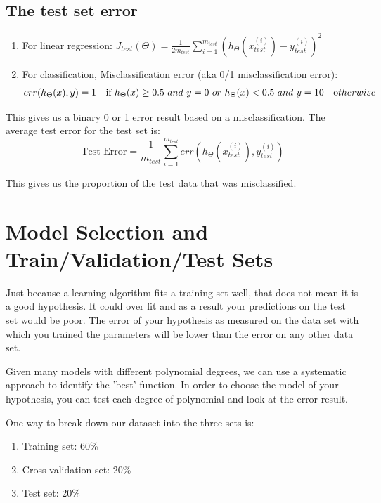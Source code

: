 \documentclass[10pt,a4paper,UTF8]{article}
\begin{document}
\subsection{The test set error}
\label{sec:orgfa849e7}

\begin{enumerate}
\item For linear regression: \(J_{test}(\Theta) = \frac{1}{2m_{test}}\sum_{i=1}^{m_{test}} (h_{\Theta}(x_{test}^{(i)}) - y_{test}^{(i)})^{2}\)
\item For classification, Misclassification error (aka 0/1 misclassification error):\[err(h_\Theta(x),y) = \begin{matrix} 1 & \mbox{if } h_\Theta(x) \geq 0.5\ and\ y = 0\ or\ h_\Theta(x) < 0.5\ and\ y = 1\newline 0 & \mbox otherwise \end{matrix}\]
\end{enumerate}

This gives us a binary 0 or 1 error result based on a misclassification. The average test error for the test set is:
\begin{equation}
\label{eq:1}
\text{Test Error} = \dfrac{1}{m_{test}} \sum^{m_{test}}_{i=1} err(h_\Theta(x^{(i)}_{test}), y^{(i)}_{test})
\end{equation}

This gives us the proportion of the test data that was misclassified.
\section{Model Selection and Train/Validation/Test Sets}
\label{sec:org9789aa7}


Just because a learning algorithm fits a training set well, that does not mean it is a good hypothesis. It could over fit and as a result your predictions on the test set would be poor. The error of your hypothesis as measured on the data set with which you trained the parameters will be lower than the error on any other data set.

Given many models with different polynomial degrees, we can use a systematic approach to identify the 'best' function. In order to choose the model of your hypothesis, you can test each degree of polynomial and look at the error result.

One way to break down our dataset into the three sets is:

\begin{enumerate}
\item Training set: 60\%
\item Cross validation set: 20\%
\item Test set: 20\%
\end{enumerate}
\end{document}
